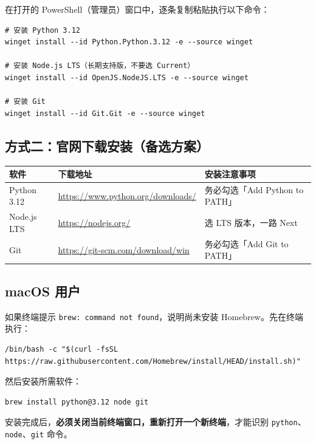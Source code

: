 在打开的 PowerShell（管理员）窗口中，逐条复制粘贴执行以下命令：

\begin{lstlisting}[style=shell]
# 安装 Python 3.12
winget install --id Python.Python.3.12 -e --source winget

# 安装 Node.js LTS（长期支持版，不要选 Current）
winget install --id OpenJS.NodeJS.LTS -e --source winget

# 安装 Git
winget install --id Git.Git -e --source winget
\end{lstlisting}

\subsection{方式二：官网下载安装（备选方案）}

\begin{table}[H]
\centering
\small
\begin{tabular}{lp{5.5cm}p{5cm}}
\toprule
\textbf{软件} & \textbf{下载地址} & \textbf{安装注意事项} \\
\midrule
Python 3.12 & \url{https://www.python.org/downloads/} & 务必勾选「Add Python to PATH」 \\
Node.js LTS & \url{https://nodejs.org/} & 选 LTS 版本，一路 Next \\
Git & \url{https://git-scm.com/download/win} & 务必勾选「Add Git to PATH」 \\
\bottomrule
\end{tabular}
\end{table}

\subsection{macOS 用户}

如果终端提示 \texttt{brew: command not found}，说明尚未安装 Homebrew。先在终端执行：

\begin{lstlisting}[style=shell]
/bin/bash -c "$(curl -fsSL https://raw.githubusercontent.com/Homebrew/install/HEAD/install.sh)"
\end{lstlisting}

然后安装所需软件：

\begin{lstlisting}[style=shell]
brew install python@3.12 node git
\end{lstlisting}

\begin{warningbox}[注意]
安装完成后，\textbf{必须关闭当前终端窗口，重新打开一个新终端}，才能识别 \texttt{python}、\texttt{node}、\texttt{git} 命令。
\end{warningbox}

